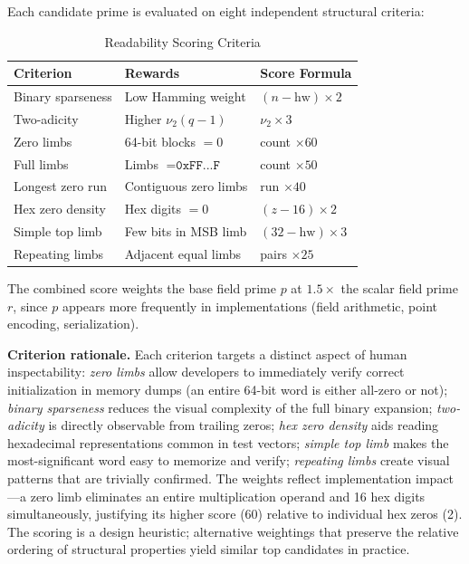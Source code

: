 Each candidate prime is evaluated on eight independent structural
criteria:

\begin{table}[t]
\centering
\caption{Readability Scoring Criteria}
\begin{tabular}{lll}
\toprule
Criterion & Rewards & Score Formula \\
\midrule
Binary sparseness & Low Hamming weight & \((n - \text{hw}) \times 2\) \\
Two-adicity & Higher \(\nu_2(q-1)\) & \(\nu_2 \times 3\) \\
Zero limbs & 64-bit blocks \(= 0\) & count \(\times 60\) \\
Full limbs & Limbs \(= \texttt{0xFF...F}\) & count \(\times 50\) \\
Longest zero run & Contiguous zero limbs & run \(\times 40\) \\
Hex zero density & Hex digits \(= 0\) & \((z - 16) \times 2\) \\
Simple top limb & Few bits in MSB limb & \((32 - \text{hw}) \times 3\) \\
Repeating limbs & Adjacent equal limbs & pairs \(\times 25\) \\
\bottomrule
\end{tabular}
\end{table}

The combined score weights the base field prime \(p\) at \(1.5\times\)
the scalar field prime \(r\), since \(p\) appears more frequently in
implementations (field arithmetic, point encoding, serialization).

\textbf{Criterion rationale.} Each criterion targets a distinct aspect
of human inspectability: \emph{zero limbs} allow developers to
immediately verify correct initialization in memory dumps (an entire
64-bit word is either all-zero or not); \emph{binary sparseness} reduces
the visual complexity of the full binary expansion; \emph{two-adicity}
is directly observable from trailing zeros; \emph{hex zero density} aids
reading hexadecimal representations common in test vectors; \emph{simple
top limb} makes the most-significant word easy to memorize and verify;
\emph{repeating limbs} create visual patterns that are trivially
confirmed. The weights reflect implementation impact---a zero limb
eliminates an entire multiplication operand and 16 hex digits
simultaneously, justifying its higher score (60) relative to individual
hex zeros (2). The scoring is a design heuristic; alternative weightings
that preserve the relative ordering of structural properties yield
similar top candidates in practice.

